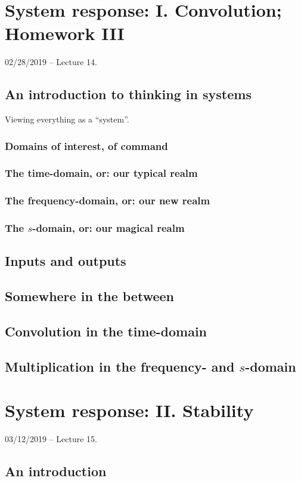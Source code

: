 \documentclass[11pt]{book}
\begin{document}
\chapter{System response: I. Convolution; Homework III}
02/28/2019 – Lecture 14. 
\section{An introduction to thinking in systems}
Viewing everything as a ``system''. 
\subsection{Domains of interest, of command}
\subsection{The time-domain, or: our typical realm}
\subsection{The frequency-domain, or: our new realm}
\subsection{The $s$-domain, or: our magical realm}
\section{Inputs and outputs}
\section{Somewhere in the between}
\section{Convolution in the time-domain}
\section{Multiplication in the frequency- and $s$-domain}



\chapter{System response: II. Stability}
03/12/2019 – Lecture 15. 
\section{An introduction}
\end{document}
